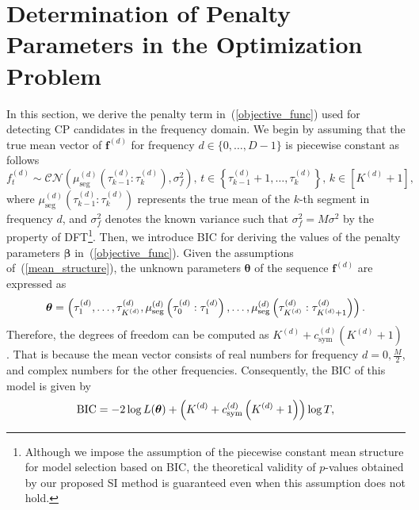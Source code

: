 \appendix

\section{Determination of Penalty Parameters in the Optimization Problem}
\label{app:penalty}

In this section, we derive the penalty term in~(\ref{objective_func}) used for detecting CP candidates in the frequency domain.
We begin by assuming that the true mean vector of $\bm{f}^{(d)}$ for frequency $d \in \{0, \dots, D-1\}$ is piecewise constant as follows
\begin{equation}
  f_t^{(d)} \sim \mathcal{CN}\left(\mu_{\text{seg}}^{(d)}\left(\tau_{k-1}^{(d)} : \tau_{k}^{(d)}\right), \sigma_f^2\right), \, t \in \left\{\tau_{k-1}^{(d)}+1, \dots, \tau_k^{(d)}\right\}, \, k \in [K^{(d)}+1], \label{mean_structure}
\end{equation}
where $\mu_{\text{seg}}^{(d)}\left(\tau_{k-1}^{(d)} : \tau_{k}^{(d)}\right)$ represents the true mean of the $k$-th segment in frequency $d$, and $\sigma_f^2$ denotes the known variance such that $\sigma_f^2 = M \sigma^2$ by the property of DFT\footnote{
Although we impose the assumption of the piecewise constant mean structure for model selection based on BIC, 
the theoretical validity of $p$-values obtained by our proposed SI method is guaranteed even when this assumption does not hold.
}.
Then, we introduce BIC for deriving the values of the penalty parameters $\bm{\beta}$ in~(\ref{objective_func}). 
Given the assumptions of~(\ref{mean_structure}), 
the unknown parameters $\bm{\theta}$ of the sequence $\bm{f}^{(d)}$ are expressed as 
\begin{equation}
  \bm{\theta} = \left(\tau_1^{(d)}, \dots, \tau_{K^{(d)}}^{(d)}, \mu_{\text{seg}}^{(d)}\left(\tau_{0}^{(d)} : \tau_{1}^{(d)}\right), \dots, \mu_{\text{seg}}^{(d)}\left(\tau_{K^{(d)}}^{(d)} : \tau_{K^{(d)}+1}^{(d)}\right)\right). \notag 
\end{equation}
Therefore, the degrees of freedom can be computed as $K^{(d)}+c_{\text{sym}}^{(d)}\left(K^{(d)}+1\right)$. 
That is because the mean vector consists of real numbers for frequency $d = 0, \frac{M}{2}$, 
and complex numbers for the other frequencies. 
Consequently, the BIC of this model is given by 
\begin{equation}
  \text{BIC} = -2 \log L(\bm{\theta}) + \left(K^{(d)}+c_{\text{sym}}^{(d)}\left(K^{(d)}+1\right)\right) \log T, \notag
\end{equation}

